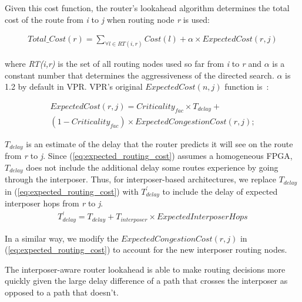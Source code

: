 \documentclass{sig-alternate-2013}
\begin{document}
Given this cost function, the router's lookahead algorithm determines the total cost of the route from \textit{i} to \textit{j} when routing node \textit{r} is used:

\begin{equation} \label{eq:lookahead_cost}
\begin{split}
Total\_Cost(r) = \sum_{\forall l \in RT(i,r)} Cost(l) + \alpha \times ExpectedCost(r,j)
\end{split}
\end{equation}

where \textit{RT(i,r)} is the set of all routing nodes used so far from \textit{i} to \textit{r} and $\alpha$ is a constant number that determines the aggressiveness of the directed search. $\alpha$ is 1.2 by default in VPR. VPR's original $ExpectedCost(n,j)$ function is~\cite{betz1999architecture}: 

\begin{equation} \label{eq:expected_routing_cost}
\begin{split}
ExpectedCost(r,j) = Criticality_{fac} \times T_{delay} + \\(1 - Criticality_{fac}) \times ExpectedCongestionCost(r,j);
\end{split}
\end{equation}

$T_{delay}$ is an estimate of the delay that the router predicts it will see on the route from \textit{r} to \textit{j}. Since (\ref{eq:expected_routing_cost}) assumes a homogeneous FPGA, $T_{delay}$ does not include the additional delay some routes experience by going through the interposer. Thus, for interposer-based architectures, we replace $T_{delay}$ in (\ref{eq:expected_routing_cost}) with $T^\prime_{delay}$ to include the delay of expected interposer hops from \textit{r} to \textit{j}.
\begin{equation} \label{eq:tdelay}
\begin{split}
T^\prime_{delay} = T_{delay} + T_{interposer} \times ExpectedInterposerHops
\end{split}
\end{equation}

In a similar way, we modify the $ExpectedCongestionCost(r,j)$ in (\ref{eq:expected_routing_cost}) to account for the new interposer routing nodes. 

The interposer-aware router lookahead is able to make routing decisions more quickly given the large delay difference of a path that crosses the interposer as opposed to a path that doesn't.
\end{document}
